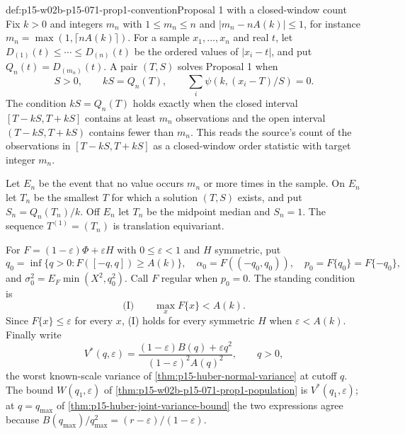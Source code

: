 \begin{hbdefinition}{def:p15-w02b-p15-071-prop1-convention}{Proposal 1 with a closed-window count}
Fix \(k>0\) and integers \(m_n\) with \(1\leq m_n\leq n\) and
\(|m_n-nA(k)|\leq1\), for instance \(m_n=\max(1,\lceil nA(k)\rceil)\).
For a sample \(x_1,\ldots,x_n\) and real \(t\), let
\(D_{(1)}(t)\leq\cdots\leq D_{(n)}(t)\) be the ordered values of
\(|x_i-t|\), and put \(Q_n(t)=D_{(m_n)}(t)\). A pair \((T,S)\) solves
Proposal 1 when
\[
 S>0,\qquad kS=Q_n(T),\qquad \sum_i\psi(k,(x_i-T)/S)=0 .
\]
The condition \(kS=Q_n(T)\) holds exactly when the closed interval
\([T-kS,T+kS]\) contains at least \(m_n\) observations and the open
interval \((T-kS,T+kS)\) contains fewer than \(m_n\). This reads the
source's count of the observations in \([T-kS,T+kS]\)
\cite[p.~96]{Huber1964RobustLocation} as a closed-window order
statistic with target integer \(m_n\).

Let \(E_n\) be the event that no value occurs \(m_n\) or more times in
the sample. On \(E_n\) let \(T_n\) be the smallest \(T\) for which a
solution \((T,S)\) exists, and put \(S_n=Q_n(T_n)/k\). Off \(E_n\) let
\(T_n\) be the midpoint median and \(S_n=1\). The sequence
\(T^{(1)}=(T_n)\) is translation equivariant.

For \(F=(1-\varepsilon)\Phi+\varepsilon H\) with \(0\leq\varepsilon<1\)
and \(H\) symmetric, put
\[
 q_0=\inf\{q>0:F([-q,q])\geq A(k)\},\quad
 \alpha_0=F((-q_0,q_0)),\quad
 p_0=F\{q_0\}=F\{-q_0\},
\]
and \(\sigma_0^2=E_F\min(X^2,q_0^2)\). Call \(F\) regular when
\(p_0=0\). The standing condition is
\[
 \text{(I)}\qquad \max_xF\{x\}<A(k).
\]
Since \(F\{x\}\leq\varepsilon\) for every \(x\), (I) holds for every
symmetric \(H\) when \(\varepsilon<A(k)\). Finally write
\[
 V^*(q,\varepsilon)=\frac{(1-\varepsilon)B(q)+\varepsilon q^2}
                         {(1-\varepsilon)^2A(q)^2},\qquad q>0,
\]
the worst known-scale variance of \cref{thm:p15-huber-normal-variance}
at cutoff \(q\). The bound \(W(q_1,\varepsilon)\) of
\cref{thm:p15-w02b-p15-071-prop1-population} is \(V^*(q_1,\varepsilon)\);
at \(q=q_{\max}\) of \cref{thm:p15-huber-joint-variance-bound} the two
expressions agree because \(B(q_{\max})/q_{\max}^2=(r-\varepsilon)/(1-\varepsilon)\).
\end{hbdefinition}

